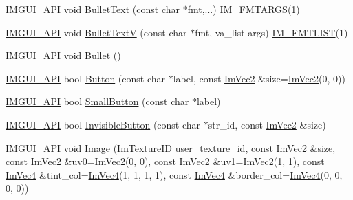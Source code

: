 \begin{DoxyCompactItemize}
\item 
\mbox{\hyperlink{imgui_8h_a43829975e84e45d1149597467a14bbf5}{I\+M\+G\+U\+I\+\_\+\+A\+PI}} void \mbox{\hyperlink{namespace_im_gui_af8d34d563b17c683943a0fa7bf5807bc}{Bullet\+Text}} (const char $\ast$fmt,...) \mbox{\hyperlink{imgui_8h_a1251c2f9ddac0873dbad8181bd82c9f1}{I\+M\+\_\+\+F\+M\+T\+A\+R\+GS}}(1)
\item 
\mbox{\hyperlink{imgui_8h_a43829975e84e45d1149597467a14bbf5}{I\+M\+G\+U\+I\+\_\+\+A\+PI}} void \mbox{\hyperlink{namespace_im_gui_af8f4b5e96c745e205974857f9a584583}{Bullet\+TextV}} (const char $\ast$fmt, va\+\_\+list args) \mbox{\hyperlink{imgui_8h_a047693beb7f899f5deab1e20202016b3}{I\+M\+\_\+\+F\+M\+T\+L\+I\+ST}}(1)
\item 
\mbox{\hyperlink{imgui_8h_a43829975e84e45d1149597467a14bbf5}{I\+M\+G\+U\+I\+\_\+\+A\+PI}} void \mbox{\hyperlink{namespace_im_gui_ae2d22212681556d2c2398dfd152f3121}{Bullet}} ()
\item 
\mbox{\hyperlink{imgui_8h_a43829975e84e45d1149597467a14bbf5}{I\+M\+G\+U\+I\+\_\+\+A\+PI}} bool \mbox{\hyperlink{namespace_im_gui_a38094c568ce398db5a3abb9d3ac92030}{Button}} (const char $\ast$label, const \mbox{\hyperlink{struct_im_vec2}{Im\+Vec2}} \&size=\mbox{\hyperlink{struct_im_vec2}{Im\+Vec2}}(0, 0))
\item 
\mbox{\hyperlink{imgui_8h_a43829975e84e45d1149597467a14bbf5}{I\+M\+G\+U\+I\+\_\+\+A\+PI}} bool \mbox{\hyperlink{namespace_im_gui_a5b76ec69758aeb0a00a66f142f7a4fb2}{Small\+Button}} (const char $\ast$label)
\item 
\mbox{\hyperlink{imgui_8h_a43829975e84e45d1149597467a14bbf5}{I\+M\+G\+U\+I\+\_\+\+A\+PI}} bool \mbox{\hyperlink{namespace_im_gui_a22668d440cbbb1f8be07241d9c6d9096}{Invisible\+Button}} (const char $\ast$str\+\_\+id, const \mbox{\hyperlink{struct_im_vec2}{Im\+Vec2}} \&size)
\item 
\mbox{\hyperlink{imgui_8h_a43829975e84e45d1149597467a14bbf5}{I\+M\+G\+U\+I\+\_\+\+A\+PI}} void \mbox{\hyperlink{namespace_im_gui_ad8705ac3b718c1b2e84e7b8c34f90249}{Image}} (\mbox{\hyperlink{imgui_8h_a364f4447ecbc4ca176145ccff9db6286}{Im\+Texture\+ID}} user\+\_\+texture\+\_\+id, const \mbox{\hyperlink{struct_im_vec2}{Im\+Vec2}} \&size, const \mbox{\hyperlink{struct_im_vec2}{Im\+Vec2}} \&uv0=\mbox{\hyperlink{struct_im_vec2}{Im\+Vec2}}(0, 0), const \mbox{\hyperlink{struct_im_vec2}{Im\+Vec2}} \&uv1=\mbox{\hyperlink{struct_im_vec2}{Im\+Vec2}}(1, 1), const \mbox{\hyperlink{struct_im_vec4}{Im\+Vec4}} \&tint\+\_\+col=\mbox{\hyperlink{struct_im_vec4}{Im\+Vec4}}(1, 1, 1, 1), const \mbox{\hyperlink{struct_im_vec4}{Im\+Vec4}} \&border\+\_\+col=\mbox{\hyperlink{struct_im_vec4}{Im\+Vec4}}(0, 0, 0, 0))

\end{DoxyCompactItemize}
